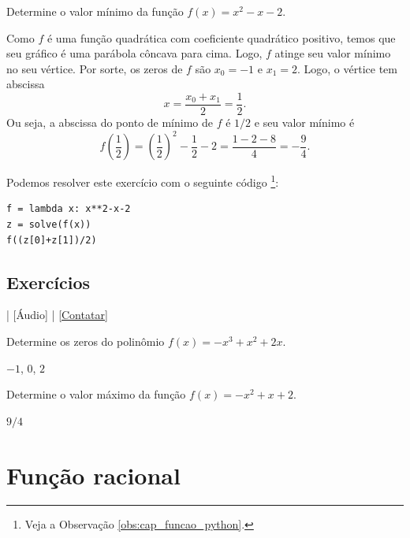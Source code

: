 \begin{exeresol}
  Determine o valor mínimo da função $f(x) = x^2 - x - 2$.
\end{exeresol}
\begin{resol}
  Como $f$ é uma função quadrática com coeficiente quadrático positivo, temos que seu gráfico é uma parábola côncava para cima. Logo, $f$ atinge seu valor mínimo no seu vértice. Por sorte, os zeros de $f$ são $x_0 = -1$ e $x_1 = 2$. Logo, o vértice tem abscissa
  \begin{equation}
    x = \frac{x_0 + x_1}{2} = \frac{1}{2}.
  \end{equation}
  Ou seja, a abscissa do ponto de mínimo de $f$ é $1/2$ e seu valor mínimo é
  \begin{equation}
    f\left(\frac{1}{2}\right) = \left(\frac{1}{2}\right)^2-\frac{1}{2}-2 = \frac{1-2-8}{4} = -\frac{9}{4}.
  \end{equation}

  \ifispython
  Podemos resolver este exercício com o seguinte código \sympy\footnote{Veja a Observação \ref{obs:cap_funcao_python}.}:
\begin{verbatim}
f = lambda x: x**2-x-2
z = solve(f(x))
f((z[0]+z[1])/2)
\end{verbatim}
  \fi
\end{resol}

\subsection*{Exercícios}

\begin{flushright}
  [Vídeo] | [Áudio] | \href{https://phkonzen.github.io/notas/contato.html}{[Contatar]}
\end{flushright}

\begin{exer}
  Determine os zeros do polinômio $f(x) = -x^3+x^2+2x$.
\end{exer}
\begin{resp}
  $-1$, $0$, $2$
\end{resp}

\begin{exer}
  Determine o valor máximo da função $f(x) = -x^2 + x + 2$.
\end{exer}
\begin{resp}
  $9/4$
\end{resp}

\section{Função racional}\label{cap_funcao_sec_funracio}

